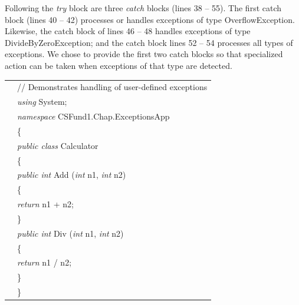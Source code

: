 Following the \emph{try} block are three \emph{catch} blocks
(lines 38 -- 55). The first catch block (lines 40 -- 42) processes
or handles exceptions of type OverflowException. Likewise, the
catch block of lines 46 -- 48 handles exceptions of type
DivideByZeroException; and the catch block lines 52 -- 54
processes all types of exceptions. We chose to provide the first
two catch blocks so that specialized action can be taken when
exceptions of that type are detected.


\renewcommand{\baselinestretch}{0.8}
\begin{program}
\begin{tabular}{ >{\codelinenumfont}c >{\codelistingfont}l}

1 & // Demonstrates handling of user-defined exceptions \\
2 & \emph{using} System;  \\
3 & \emph{namespace} CSFund1.Chap\thechapter.ExceptionsApp  \\
4 & \{  \\
5 & \hspace{0.2in} \emph{public class} Calculator  \\
6 & \hspace{0.2in} \{  \\
7 & \hspace{0.4in} \emph{public int} Add (\emph{int} n1, \emph{int} n2)  \\
8 & \hspace{0.4in} \{  \\
9 & \hspace{0.6in} \emph{return} n1 + n2;  \\
10 & \hspace{0.4in} \}  \\
11 & \hspace{0.4in} \emph{public int} Div (\emph{int} n1, \emph{int} n2)  \\
12 & \hspace{0.4in} \{  \\
13 & \hspace{0.6in} \emph{return} n1 / n2;  \\
14 & \hspace{0.4in} \}  \\
15 & \hspace{0.2in} \}  \\


\end{tabular}
\end{program}

